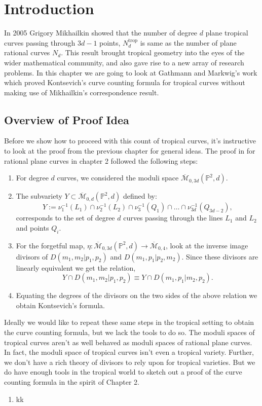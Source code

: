 \section{Introduction}
In 2005 Grigory Mikhailkin showed that the number of degree $d$ plane tropical curves passing through $3d-1$ points, $N^{\text{trop}}_{d}$ is same as the number of plane rational curves $N_{d}$.
This result brought tropical geometry into the eyes of the wider mathematical community, and also gave rise to a new array of research problems.
In this chapter we are going to look at Gathmann and Markwig's work which proved Kontsevich's curve counting formula for tropical curves without making use of Mikhailkin's correspondence result.

\subsection{Overview of Proof Idea}
Before we show how to proceed with this count of tropical curves, it's instructive to look at the proof from the previous chapter for general ideas.
The proof in for rational plane curves in chapter 2 followed the following steps:
\begin{enumerate}
    \item For degree $d$ curves, we considered the moduli space $\overline{\mathcal{M}}_{0,3d}(\mathbb{P}^{2},d)$.
    \item The subvariety $Y \subset \overline{\mathcal{M}}_{0,d}(\mathbb{P}^{2},d)$ defined by:
        \[
            Y:= \nu_{1}^{-1}(L_{1}) \cap \nu_{2}^{-1}(L_{2}) \cap \nu_{3}^{-1}(Q_{1}) \cap \dots \cap \nu_{3d}^{-1}(Q_{3d-2}),
        \]
        corresponds to the set of degree $d$ curves passing through the lines $L_{1}$ and $L_{2}$ and points $Q_{i}$.
    \item For the forgetful map, $\eta: \overline{\mathcal{M}}_{0,3d}(\mathbb{P}^{2},d)\to \overline{\mathcal{M}}_{0,4}$, look at the inverse image divisors of $D(m_{1}, m_{2}|p_{1}, p_{2})$ and $D(m_{1}, p_{1}|p_{2}, m_{2})$.
        Since these divisors are linearly equivalent we get the relation, 
        \[
            Y \cap D(m_{1}, m_{2} | p_{1}, p_{2}) \equiv Y \cap D(m_{1}, p_{1} | m_{2}, p_{2}).
        \]
    \item Equating the degrees of the divisors on the two sides of the above relation we obtain Kontsevich's formula.
\end{enumerate}

Ideally we would like to repeat these same steps in the tropical setting to obtain the curve counting formula, but we lack the tools to do so.
The moduli spaces of tropical curves aren't as well behaved as moduli spaces of rational plane curves.
In fact, the moduli space of tropical curves isn't even a tropical variety.
Further, we don't have a rich theory of divisors to rely upon for tropical varieties. 
But we do have enough tools in the tropical world to sketch out a proof of the curve counting formula in the spirit of Chapter 2.
\begin{enumerate}
    \item kk
\end{enumerate}


